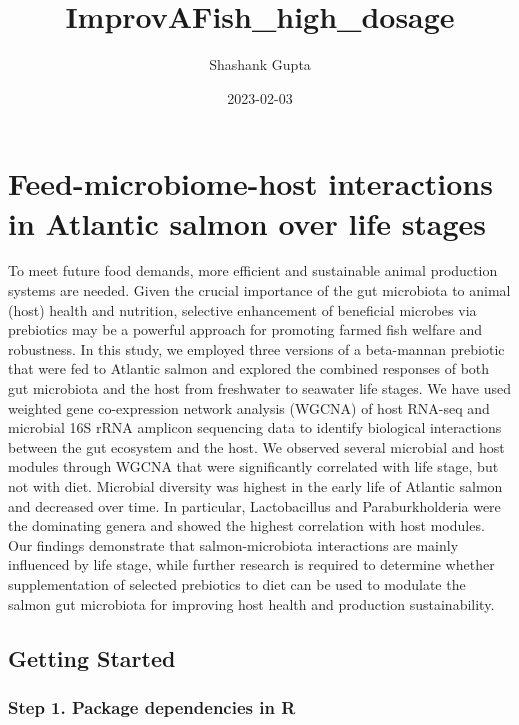 \documentclass[
]{article}
\title{ImprovAFish\_high\_dosage}
\author{Shashank Gupta}
\date{2023-02-03}
\begin{document}
\maketitle

\hypertarget{feed-microbiome-host-interactions-in-atlantic-salmon-over-life-stages}{%
\section{Feed-microbiome-host interactions in Atlantic salmon over life
stages}\label{feed-microbiome-host-interactions-in-atlantic-salmon-over-life-stages}}

To meet future food demands, more efficient and sustainable animal
production systems are needed. Given the crucial importance of the gut
microbiota to animal (host) health and nutrition, selective enhancement
of beneficial microbes via prebiotics may be a powerful approach for
promoting farmed fish welfare and robustness. In this study, we employed
three versions of a beta-mannan prebiotic that were fed to Atlantic
salmon and explored the combined responses of both gut microbiota and
the host from freshwater to seawater life stages. We have used weighted
gene co-expression network analysis (WGCNA) of host RNA-seq and
microbial 16S rRNA amplicon sequencing data to identify biological
interactions between the gut ecosystem and the host. We observed several
microbial and host modules through WGCNA that were significantly
correlated with life stage, but not with diet. Microbial diversity was
highest in the early life of Atlantic salmon and decreased over time. In
particular, Lactobacillus and Paraburkholderia were the dominating
genera and showed the highest correlation with host modules. Our
findings demonstrate that salmon-microbiota interactions are mainly
influenced by life stage, while further research is required to
determine whether supplementation of selected prebiotics to diet can be
used to modulate the salmon gut microbiota for improving host health and
production sustainability.

\hypertarget{getting-started}{%
\subsection{Getting Started}\label{getting-started}}

\hypertarget{step-1.-package-dependencies-in-r}{%
\subsubsection{Step 1. Package dependencies in
R}\label{step-1.-package-dependencies-in-r}}
\end{document}
